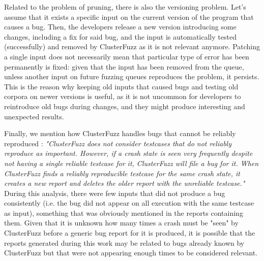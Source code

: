 Related to the problem of pruning, there is also the versioning problem.
Let's assume that it exists a specific input on the current version of the program that causes a bug. Then, the developers release a new version introducing some changes, including a fix for said bug, and the input is automatically tested (successfully) and removed by ClusterFuzz as it is not relevant anymore. Patching a single input does not necessarily mean that particular type of error has been permanently is fixed: given that the input has been removed from the queue, unless another input on future fuzzing queues reproduces the problem, it persists. This is the reason why keeping old inputs that caused bugs and testing old corpora on newer versions is useful, as it is not uncommon for developers to reintroduce old bugs during changes, and they might produce interesting and unexpected results.

Finally, we mention how ClusterFuzz handles bugs that cannot be reliably reproduced \cite{unreliable}: \textit{"ClusterFuzz does not consider testcases that do not reliably reproduce as important. However, if a crash state is seen very frequently despite not having a single reliable testcase for it, ClusterFuzz will file a bug for it. When ClusterFuzz finds a reliably reproducible testcase for the same crash state, it creates a new report and deletes the older report with the unreliable testcase."} During this analysis, there were few inputs that did not produce a bug consistently (i.e. the bug did not appear on all execution with the same testcase as input), something that was obviously mentioned in the reports containing them. Given that it is unknown how many times a crash must be "seen" by ClusterFuzz before a generic bug report for it is produced, it is possible that the reports generated during this work may be related to bugs already known by ClusterFuzz but that were not appearing enough times to be considered relevant.



